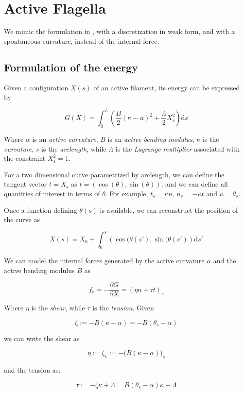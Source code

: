 \documentclass[12pt]{article}
\renewcommand{\d}{\mathrm{d}}
\begin{document}
\section{Active Flagella}\label{active-flagella}

We mimic the formulation in \cite{CamaletJulicher2000}, with a
discretization in weak form, and with a spontaneous curvature, instead
of the internal force.

\subsection{Formulation of the energy}\label{formulation-of-the-energy}

Given a configuration \(X(s)\) of an active filament, its energy can be expressed by

\[G(X) = \int_0^L \left( \frac{B}{2}(\kappa-\alpha)^2 +
  \frac{\Lambda}{2} X_s^2 \right) \d s\]

Where $\alpha$ is an \emph{active curvature}, $B$ is an \emph{active
  bending modulus}, $\kappa$ is the \emph{curvature}, $s$ is the
\emph{arclength}, while $\Lambda$ is the \emph{Lagrange multiplier}
associated with the constraint $X_s^2 = 1$.

For a two dimensional curve parametrized by arclength, we can define
the tangent vector $t = X_s$ as $t = (\cos(\theta), \sin(\theta))$, and
we can define all quantities of interest in terms of $\theta$. For
example, $t_s = \kappa n$, $n_s = -\kappa t$ and $\kappa = \theta_s$.

Once a function defining \(\theta(s)\) is available, we can reconstruct
the position of the curve as

\[X(s) = X_0 + \int_0^s \left(\cos(\theta(s'), \sin(\theta(s') \right)
\d s'\]

We can model the internal forces generated by the active curvature
$\alpha$ and the active bending modulus $B$ as

\[f_e = -\frac{\partial G}{\partial X} = (\eta n + \tau t)_s\]

Where \(\eta\) is the \emph{shear}, while $\tau$ is the
\emph{tension}. Given 

\[\zeta := -B(\kappa - \alpha) = -B(\theta_s - \alpha)\]

we can write the shear as

\[\eta := \zeta_s := -\big( B(\kappa - \alpha) \big)_s\]

and the tension as:

\[\tau := -\zeta\kappa + \Lambda = B(\theta_s-\alpha)\kappa +\Lambda\]
\end{document}
